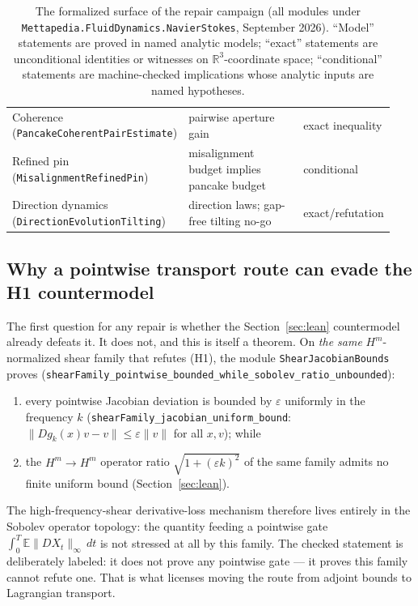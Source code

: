 \documentclass[11pt]{article}
\theoremstyle{definition}
\newcommand{\Hm}{H^m}
\begin{document}
\begin{table}[htbp]
\begin{tabular}{>{\raggedright\arraybackslash}p{0.32\linewidth}>{\raggedright\arraybackslash}p{0.43\linewidth}>{\raggedright\arraybackslash}p{0.19\linewidth}}
Coherence (\texttt{PancakeCoherentPairEstimate}) & pairwise aperture gain & exact inequality \\
Refined pin (\texttt{MisalignmentRefinedPin}) & misalignment budget implies pancake budget & conditional \\
Direction dynamics (\texttt{DirectionEvolutionTilting}) & direction laws; gap-free tilting no-go & exact/refutation \\
\bottomrule
\end{tabular}
\caption{The formalized surface of the repair campaign (all modules under
\texttt{Mettapedia.FluidDynamics.NavierStokes}, September 2026).  ``Model''
statements are proved in named analytic models; ``exact'' statements are
unconditional identities or witnesses on $\mathbb{R}^3$-coordinate space;
``conditional'' statements are machine-checked implications whose analytic
inputs are named hypotheses.}
\label{tab:surface}
\end{table}

\subsection{Why a pointwise transport route can evade the H1 countermodel}
\label{sec:evasion}

The first question for any repair is whether the Section~\ref{sec:lean}
countermodel already defeats it.  It does not, and this is itself a theorem.
On \emph{the same} $\Hm$-normalized shear family that refutes (H1), the
module \texttt{ShearJacobianBounds} proves
(\texttt{shearFamily\_pointwise\_bounded\_while\_sobolev\_ratio\_unbounded}):

\begin{enumerate}
  \item every pointwise Jacobian deviation is bounded by $\varepsilon$
        uniformly in the frequency $k$
        (\texttt{shearFamily\_jacobian\_uniform\_bound}:
        $\|Dg_k(x)v - v\| \le \varepsilon\|v\|$ for all $x,v$); while
  \item the $\Hm\to\Hm$ operator ratio $\sqrt{1+(\varepsilon k)^2}$ of the
        same family admits no finite uniform bound (Section~\ref{sec:lean}).
\end{enumerate}

The high-frequency-shear derivative-loss mechanism therefore lives entirely
in the Sobolev operator topology: the quantity feeding a pointwise gate
$\int_0^T \mathbb{E}\|DX_t\|_\infty\,dt$ is not stressed at all by this
family.  The checked statement is deliberately labeled: it does not prove any
pointwise gate --- it proves this family cannot refute one.  That is what
licenses moving the route from adjoint bounds to Lagrangian transport.
\end{document}
